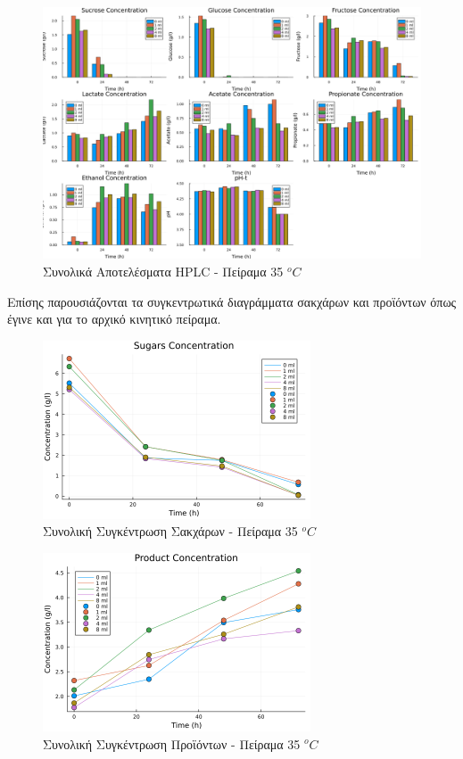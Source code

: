 \documentclass[11pt]{report}
\begin{document}
\begin{enumerate}
\begin{figure}[htbp]
\centering
\includegraphics[width=.9\linewidth]{../plots/10_11/final_bar_10_11.png}
\caption{\label{fig:org99252a8}Συνολικά Αποτελέσματα HPLC - Πείραμα 35 \(^oC\)}
\end{figure}

Επίσης παρουσιάζονται τα συγκεντρωτικά διαγράμματα σακχάρων και προϊόντων όπως έγινε και για το αρχικό κινητικό πείραμα. 

\begin{figure}[htbp]
\centering
\includegraphics[width=300px]{../plots/10_11/sugars_conc_scatter_10_11.png}
\caption{\label{fig:orgfd6671c}Συνολική Συγκέντρωση Σακχάρων - Πείραμα 35 \(^oC\)}
\end{figure}

\begin{figure}[htbp]
\centering
\includegraphics[width=300px]{../plots/10_11/product_conc_scatter_10_11.png}
\caption{\label{fig:org024ea48}Συνολική Συγκέντρωση Προϊόντων - Πείραμα 35 \(^oC\)}
\end{figure}


\end{enumerate}
\end{document}
